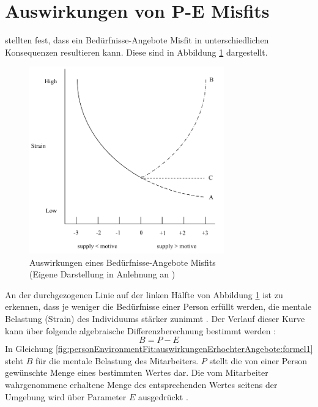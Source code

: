 \section{Auswirkungen von P-E Misfits}
\label{ch:personEnvironmentFit:auswirkungenErhoehterAngebote}
\textcite{mechanismsOfJobStressAndStrain:1982} stellten fest, dass ein Bedürfnisse-Angebote Misfit in unterschiedlichen Konsequenzen resultieren kann. Diese sind in Abbildung \ref{fig:personEnvironmentFit:auswirkungenErhoehterAngebote:abb1} dargestellt.

\begin{figure}[h]
	\centering
	\includegraphics[width=0.75\textwidth]{gfx/ueberschuss_supply_motive.png}
	\caption{Auswirkungen eines Bedürfnisse-Angebote Misfits\\(Eigene Darstellung in Anlehnung an \cite[S. 23]{edwards:2008})}
	\label{fig:personEnvironmentFit:auswirkungenErhoehterAngebote:abb1}
\end{figure}

An der durchgezogenen Linie auf der linken Hälfte von Abbildung \ref{fig:personEnvironmentFit:auswirkungenErhoehterAngebote:abb1} ist zu erkennen, dass je weniger die Bedürfnisse einer Person erfüllt werden, die mentale Belastung (Strain) des Individuums stärker zunimmt \cite[S. 30]{mechanismsOfJobStressAndStrain:1982}. Der Verlauf dieser Kurve kann über folgende algebraische Differenzberechnung bestimmt werden \cite[S. 2]{edwards:1993}:
\begin{equation}
	B = P - E
	\label{fig:personEnvironmentFit:auswirkungenErhoehterAngebote:formel1}
\end{equation}
In Gleichung \ref{fig:personEnvironmentFit:auswirkungenErhoehterAngebote:formel1} steht $B$ für die mentale Belastung des Mitarbeiters. $P$ stellt die von einer Person gewünschte Menge eines bestimmten Wertes dar. Die vom Mitarbeiter wahrgenommene erhaltene Menge des entsprechenden Wertes seitens der Umgebung wird über Parameter $E$ ausgedrückt \cite[S. 2]{edwards:1993}.

